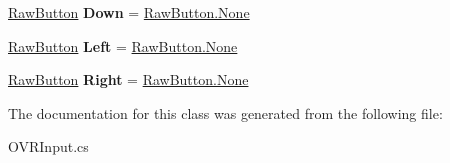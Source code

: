\begin{DoxyCompactItemize}
\mbox{\hyperlink{class_o_v_r_input_a9d6423af820e22b93f0b33a4fc4bf77a}{Raw\+Button}} {\bfseries Down} = \mbox{\hyperlink{class_o_v_r_input_a9d6423af820e22b93f0b33a4fc4bf77aa6adf97f83acf6453d4a6a4b1070f3754}{Raw\+Button.\+None}}
\item 
\mbox{\label{class_o_v_r_input_1_1_o_v_r_controller_base_1_1_virtual_button_map_ad31c71b0c518689daf274abb305b3f1d}} 
\mbox{\hyperlink{class_o_v_r_input_a9d6423af820e22b93f0b33a4fc4bf77a}{Raw\+Button}} {\bfseries Left} = \mbox{\hyperlink{class_o_v_r_input_a9d6423af820e22b93f0b33a4fc4bf77aa6adf97f83acf6453d4a6a4b1070f3754}{Raw\+Button.\+None}}
\item 
\mbox{\label{class_o_v_r_input_1_1_o_v_r_controller_base_1_1_virtual_button_map_a4f3436259e39c7c5be2b6b6762b0ca97}} 
\mbox{\hyperlink{class_o_v_r_input_a9d6423af820e22b93f0b33a4fc4bf77a}{Raw\+Button}} {\bfseries Right} = \mbox{\hyperlink{class_o_v_r_input_a9d6423af820e22b93f0b33a4fc4bf77aa6adf97f83acf6453d4a6a4b1070f3754}{Raw\+Button.\+None}}
\end{DoxyCompactItemize}


The documentation for this class was generated from the following file\+:\begin{DoxyCompactItemize}
\item 
O\+V\+R\+Input.\+cs\end{DoxyCompactItemize}

